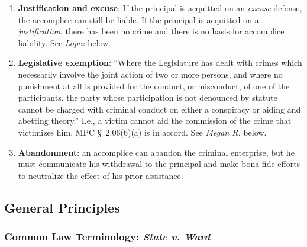 \begin{enumerate}
    \item \textbf{Justification and excuse}: If the principal is acquitted on 
    an \emph{excuse} defense, the accomplice can still be liable. If the 
    principal is acquitted on a \emph{justification}, there has been no crime 
    and there is no basis for accomplice liability. See \emph{Lopez} below.
    \item \textbf{Legislative exemption}: ``Where the Legislature has dealt 
    with crimes which necessarily involve the joint action of two or more 
    persons, and where no punishment at all is provided for the conduct, or 
    misconduct, of one of the participants, the party whose participation is 
    not denounced by statute cannot be charged with criminal conduct on either 
    a conspiracy or aiding and abetting theory.'' I.e., a victim cannot aid 
    the commission of the crime that victimizes him. MPC \S\ 2.06(6)(a) is in 
    accord. See \emph{Megan R.} below.
    \item \textbf{Abandonment}: an accomplice can abandon the criminal 
    enterprise, but he must communicate his withdrawal to the principal and 
    make bona fide efforts to neutralize the effect of his prior assistance.
\end{enumerate}

\subsection{General Principles}

\subsubsection{Common Law Terminology: \emph{State v. Ward}}

